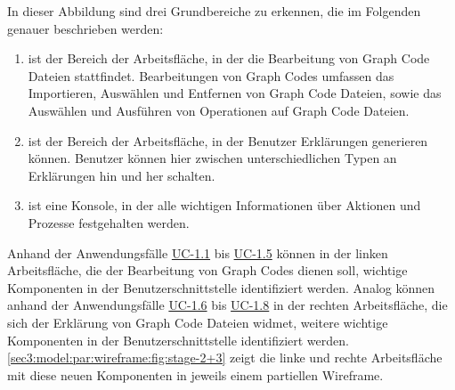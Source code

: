 In dieser Abbildung sind drei Grundbereiche zu erkennen, die im Folgenden genauer beschrieben werden:
\begin{enumerate}
    \item[\circitem{1}] ist der Bereich der Arbeitsfläche, in der die Bearbeitung von Graph Code Dateien stattfindet.
    Bearbeitungen von Graph Codes umfassen das Importieren, Auswählen und Entfernen von Graph Code Dateien, sowie das Auswählen und Ausführen von Operationen auf Graph Code Dateien.
    \item[\circitem{2}] ist der Bereich der Arbeitsfläche, in der Benutzer Erklärungen generieren können.
    Benutzer können hier zwischen unterschiedlichen Typen an Erklärungen hin und her schalten.
    \item[\circitem{3}] ist eine Konsole, in der alle wichtigen Informationen über Aktionen und Prozesse festgehalten werden.
\end{enumerate}
Anhand der Anwendungsfälle \hyperref[sec3:model:uc-1.1]{UC-1.1} bis \hyperref[sec3:model:uc-1.5]{UC-1.5} können in der linken Arbeitsfläche, die der Bearbeitung von Graph Codes dienen soll, wichtige Komponenten in der Benutzerschnittstelle identifiziert werden.
Analog können anhand der Anwendungsfälle \hyperref[sec3:model:uc-1.6]{UC-1.6} bis \hyperref[sec3:model:uc-1.8]{UC-1.8} in der rechten Arbeitsfläche, die sich der Erklärung von Graph Code Dateien widmet, weitere wichtige Komponenten in der Benutzerschnittstelle identifiziert werden.
\cref{sec3:model:par:wireframe:fig:stage-2+3} zeigt die linke und rechte Arbeitsfläche mit diese neuen Komponenten in jeweils einem partiellen Wireframe.


